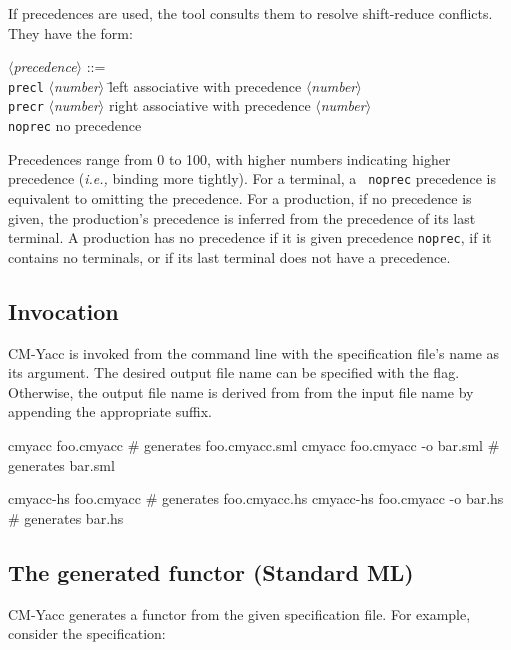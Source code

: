 \documentclass[10pt]{article}
\newcommand{\nonterm}[1]{\mbox{$\langle${\it{}#1}$\rangle$}}
\begin{document}
\begin{strictcode}
\begin{strictcode}
\begin{strictcode}
\begin{strictcode}
If precedences are used, the tool consults them to resolve
shift-reduce conflicts.  They have the form:

\begin{tabbing}
\nonterm{precedence} ::=
\\
\quad \=
{\tt precl} \nonterm{number} \quad
\= left associative with precedence \nonterm{number}
\\ \>
{\tt precr} \nonterm{number} \>
right associative with precedence \nonterm{number}
\\ \>
{\tt noprec} \>
no precedence
\end{tabbing}

Precedences range from 0 to 100, with higher numbers indicating higher
precedence ({\em i.e.,} binding more tightly).  For a terminal, a {\tt
noprec} precedence is equivalent to omitting the precedence.  For a
production, if no precedence is given, the production's precedence is
inferred from the precedence of its last terminal.  A production has no precedence
if it is given precedence {\tt noprec}, if it contains no terminals,
or if its last terminal does not have a precedence.



\subsection{Invocation}

CM-Yacc is invoked from the command line with the specification file's
name as its argument.  The desired output file name can be specified
with the  flag.  Otherwise, the output file name is derived from from
the input file name by appending the appropriate suffix.

\begin{code}
cmyacc foo.cmyacc               # generates foo.cmyacc.sml
cmyacc foo.cmyacc -o bar.sml    # generates bar.sml

cmyacc-hs foo.cmyacc            # generates foo.cmyacc.hs
cmyacc-hs foo.cmyacc -o bar.hs  # generates bar.hs
\end{code}



\subsection{The generated functor (Standard ML)}
\label{sec:yacc-functor-sml}

CM-Yacc generates a functor from the given specification file.  For example,
consider the specification:


\end{strictcode}
\end{strictcode}
\end{strictcode}
\end{strictcode}
\end{document}
